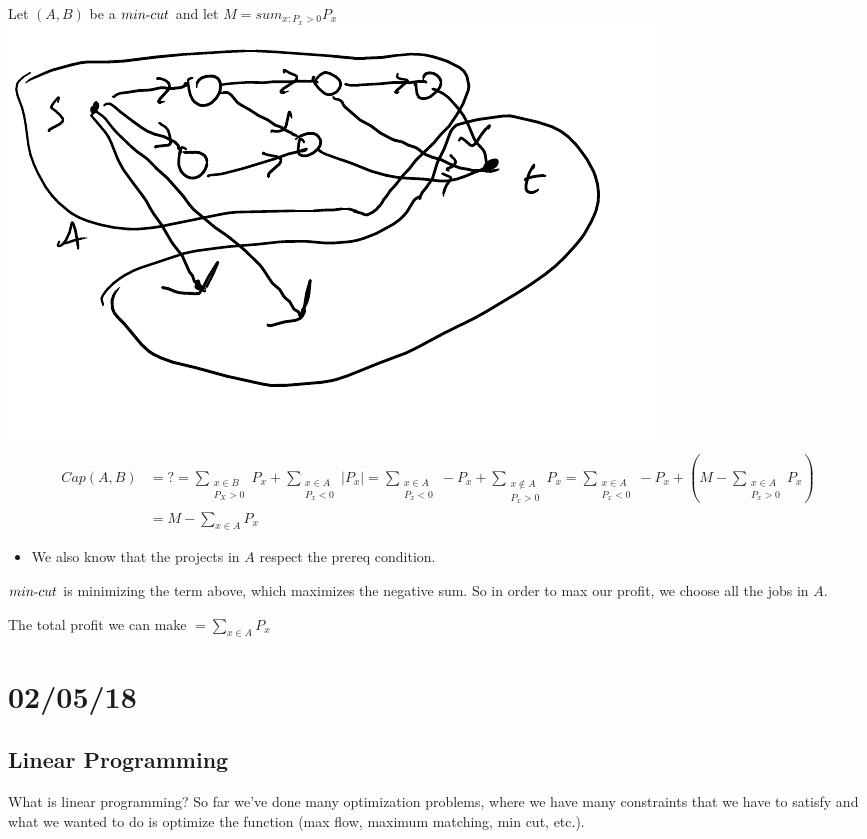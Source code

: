 \documentclass[12 pt]{article}
\begin{document}
        Let $(A,B)$ be a $min\hbox{-}cut$ and let $M=sum_{x:P_x >
          0}P_x$
        \\ \includegraphics[width=.9\textwidth]{i95.pdf}
        \begin{align*}
          Cap(A,B) & = ? = \sum_{\substack{x \in B \\ P_X > 0}} P_x + \sum_{\substack{x \in A \\ P_x < 0}} |P_x| = \sum_{\substack{x \in A \\ P_x < 0}} -P_x + \sum_{\substack{x \notin A \\ P_x > 0}}P_x = \sum_{\substack{x \in A \\ P_x < 0}} - P_x + \left(M - \sum_{\substack{x \in A \\ P_x >0}} P_x\right)
          \\ & = M - \sum_{x \in A} P_x
        \end{align*}
        \begin{itemize}
        \item We also know that the projects in $A$ respect the prereq condition.
        \end{itemize}
        $min\hbox{-}cut$ is minimizing the term above, which maximizes
        the negative sum. So in order to max our profit, we choose
        all the jobs in $A$.
        
        The total profit we can make $= \sum_{x \in A}P_x$
        \section{02/05/18}
        \subsection{Linear Programming}
        What is linear programming? So far we've done many
        optimization problems, where we have many constraints that we
        have to satisfy and what we wanted to do is optimize the
        function (max flow, maximum matching, min cut, etc.).
\end{document}
